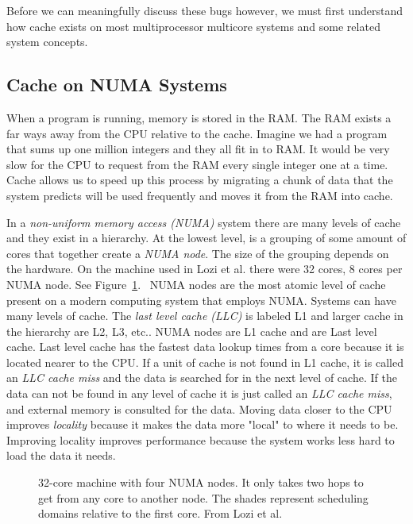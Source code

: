\documentclass{sig-alternate}
\begin{document}
Before we can meaningfully discuss these bugs however, we must first understand how cache exists on most multiprocessor multicore systems and some related system concepts.

\subsection{Cache on NUMA Systems}
\label{sec:cache}

When a program is running, memory is stored in the RAM. The RAM exists a far ways away from the CPU relative to the cache. Imagine we had a program that sums up one million integers and they all fit in to RAM. It would be very slow for the CPU to request from the RAM every single integer one at a time. Cache allows us to speed up this process by migrating a chunk of data that the system predicts will be used frequently and moves it from the RAM into cache.

In a \emph{non-uniform memory access (NUMA)} system  there are many levels of cache and they exist in a hierarchy. At the lowest level, is a grouping of some amount of cores that together create a \emph{NUMA node}. The size of the grouping depends on the hardware. On the machine used in Lozi et al. there were 32 cores, 8 cores per NUMA node. See Figure~\ref{fig:NUMA}.~\cite{Lozi:2016} NUMA nodes are the most atomic level of cache present on a modern computing system that employs NUMA. Systems can have many levels of cache. The \emph{last level cache (LLC)} is labeled L1 and larger cache in the hierarchy are L2, L3, etc.. NUMA nodes are L1 cache and are Last level cache. Last level cache has the fastest data lookup times from a core because it is located nearer to the CPU. If a unit of cache is not found in L1 cache, it is called an \emph{LLC cache miss} and the data is searched for in the next level of cache. If the data can not be found in any level of cache it is just called an \emph{LLC cache miss}, and external memory is consulted for the data. Moving data closer to the CPU improves \emph{locality} because it makes the data more "local" to where it needs to be. Improving locality improves performance because the system works less hard to load the data it needs.~\cite{WikiCache}

\begin{figure}
\centering
{}
\caption{32-core machine with four NUMA nodes. It only takes two hops to get from any core to another node. The shades represent scheduling domains relative to the first core.  From Lozi et al.~\cite{Lozi:2016}}
\label{fig:NUMA}
\end{figure}
\end{document}
